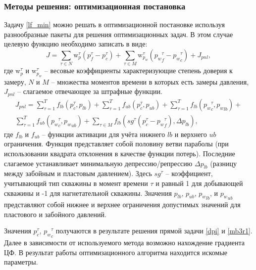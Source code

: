 \documentclass[14pt]{article}
\begin{document}
\subsubsection{Методы решения: оптимизационная постановка}
Задачу \ref{lf_min} можно решать в оптимизационной постановке используя разнообразные пакеты для решения оптимизационных задач. В этом случае целевую функцию необходимо записать в виде:
\begin{equation}\label{Jlf_min}
	J = \sum_{ \tau \in N}\mathrm{w}_p^{\tau}\left(p^{\tau}_f - p^{\tau}_c \right) +
	\sum_{ \tau \in M}\mathrm{w}_{p_w}^{\tau}\left({p_w}^{\tau}_f - {p_w}^{\tau}_c \right) +  
	J_{pnl},
\end{equation}
где $\mathrm{w}_p^{\tau}$ и $\mathrm{w}_{p_w}^{\tau}$ -- весовые коэффициенты характеризующие степень доверия к замеру, $N$ и $M$ -- множества моментов времени в которых есть замеры давления, $J_{pnl}$ -- слагаемое отвечающее за штрафные функции.
\begin{equation}\label{Jpnl}
	\begin{split}
	J_{pnl} = \sum_{\tau = 1}^{T}f_{lb}(p^{\tau}_c, p_{lb}) +
			   \sum_{\tau = 1}^{T}f_{ub}(p^{\tau}_c, p_{ub}) + 
			   \sum_{\tau = 1}^{T}f_{lb}({p_w}^{\tau}_c, {p_w}_{lb}) + \\
			   \sum_{\tau = 1}^{T}f_{ub}({p_w}^{\tau}_c, {p_w}_{ub}) +  
			   \sum_{\tau \in M}f_{lb}\left(sg^{\tau} \left(p^{\tau}_c - {p_w}^{\tau}_f \right), \Delta p_{lb}\right),
	\end{split}
\end{equation}
где $f_{lb}$ и $f_{ub}$ -- функции активации для учёта нижнего $lb$ и верхнего $ub$ ограничения. Функция представляет собой половину ветви параболы (при использовании квадрата отклонения в качестве функции потерь). Последние слагаемое устанавливает минимальную депрессию/репрессию $\Delta p_{lb}$ (разницу между забойным и пластовым давлением). Здесь $sg^{\tau}$ -- коэффициент, учитывающий тип скважины в момент времени $\tau$ и равный 1 для добывающей скважины и -1 для нагнетательной скважины. Значения $p_{lb}$, $p_{ub}$, ${p_w}_{lb}$, и ${p_w}_{ub}$ представляют собой нижнее и верхнее ограничения допустимых значений для пластового и забойного давлений.

Значения $p^{\tau}_c$, ${p_w}^{\tau}_c$ получаются в результате решения прямой задачи \ref{dpi} и \ref{mb3r1}. Далее в зависимости от используемого метода возможно нахождение градиента ЦФ. В результат работы оптимизационного алгоритма находится искомые параметры. 
\end{document}
